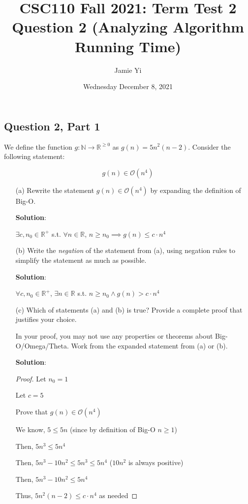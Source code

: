 \documentclass{article}
\title{CSC110 Fall 2021: Term Test 2\\
Question 2 (Analyzing Algorithm Running Time)}
\author{Jamie Yi}
\date{Wednesday December 8, 2021}
\newcommand{\N}{\mathbb{N}}
\newcommand{\R}{\mathbb{R}}
\newcommand{\cO}{\mathcal{O}}
\begin{document}
\maketitle

\subsection*{Question 2, Part 1}

\noindent
We define the function $g: \N \to \R^{\geq 0}$ as $g(n) = 5n^2(n-2)$.
Consider the following statement:

\[
g(n) \in \cO(n^4)
\]

\begin{enumerate}

\item[(a)]
Rewrite the statement $g(n) \in \cO(n^4)$ by expanding the definition of Big-O.

\bigskip

\textbf{Solution}:

$\exists c, n_0 \in \mathbb{R}^+ $ s.t. $\forall n \in \mathbb{R}$, $n \geq n_0 \implies g(n) \leq c \cdot n^4$

\item[(b)]
Write the \emph{negation} of the statement from (a), using negation rules to simplify the statement as much as possible.

\bigskip

\textbf{Solution}:

$\forall c, n_0 \in \mathbb{R}^+ $, $\exists n \in \mathbb{R}$ s.t. $n \geq n_0 \wedge g(n) > c \cdot n^4$

\item[(c)]
Which of statements (a) and (b) is true? Provide a complete proof that justifies your choice.

In your proof, you may not use any properties or theorems about Big-O/Omega/Theta. Work from the expanded statement from (a) or (b).

\bigskip

\textbf{Solution}:

\begin{proof}
Let $n_0 = 1$

Let $c = 5$

Prove that $g(n) \in \cO(n^4)$

We know, $5 \leq 5n$ (since by definition of Big-O $n \geq 1$)

Then, $5n^3 \leq 5n^4$

Then, $5n^3 - 10n^2 \leq 5n^3 \leq 5n^4$ ($10n^2$ is always positive)

Then, $5n^3 - 10n^2 \leq 5n^4$

Thus, $5n^2(n-2) \leq c \cdot n^4$ as needed

\end{proof}

\end{enumerate}
\end{document}
